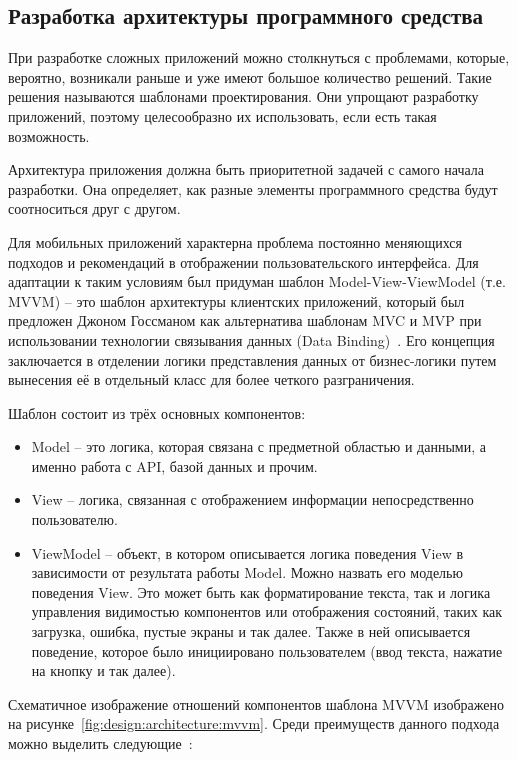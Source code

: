 \subsection{Разработка архитектуры программного средства}
\label{sec:design:architecture}

При разработке сложных приложений можно столкнуться с проблемами, которые, вероятно, возникали раньше и уже имеют большое количество решений.
Такие решения называются шаблонами проектирования.
Они упрощают разработку приложений, поэтому целесообразно их использовать, если есть такая возможность.

Архитектура приложения должна быть приоритетной задачей с самого начала разработки.
Она определяет, как разные элементы программного средства будут соотноситься друг с другом.

Для мобильных приложений характерна проблема постоянно меняющихся подходов и рекомендаций в отображении пользовательского интерфейса.
Для адаптации к таким условиям был придуман шаблон Model-View-ViewModel (т.е. MVVM) -- это шаблон архитектуры клиентских приложений, который был предложен Джоном Госсманом как альтернатива шаблонам MVC и MVP при использовании технологии связывания данных (Data Binding)~\cite{microsoft_mvvm}.
Его концепция заключается в отделении логики представления данных от бизнес-логики путем вынесения её в отдельный класс для более четкого разграничения.

Шаблон состоит из трёх основных компонентов:
\begin{itemize}
    \item Model -- это логика, которая связана с предметной областью и данными, а именно работа с API, базой данных и прочим.
    \item View -- логика, связанная с отображением информации непосредственно пользователю.
    \item ViewModel -- объект, в котором описывается логика поведения View в зависимости от результата работы Model.
    Можно назвать его моделью поведения View.
    Это может быть как форматирование текста, так и логика управления видимостью компонентов или отображения состояний, таких как загрузка, ошибка, пустые экраны и так далее.
    Также в ней описывается поведение, которое было инициировано пользователем (ввод текста, нажатие на кнопку и так далее).
\end{itemize}

Схематичное изображение отношений компонентов шаблона MVVM изображено на рисунке~\ref{fig:design:architecture:mvvm}.
Среди преимуществ данного подхода можно выделить следующие~\cite{android_mvvm}:

